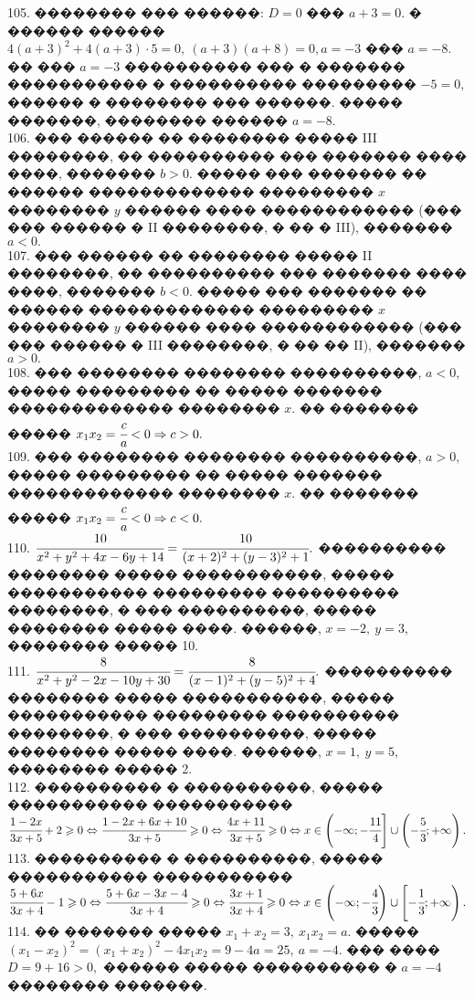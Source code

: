 \documentclass[12pt]{article}
\begin{document}
105. �������� ��� ������: $D=0$ ��� $a+3=0.$ � ������ ������ $4(a+3)^2+4(a+3)\cdot5=0,\ (a+3)(a+8)=0, a=-3$ ��� $a=-8.$ �� ��� $a=-3$ ���������� ��� � ������� ����������� � ���������� ��������� $-5=0,$ ������ � �������� ��� ������. ����� �������, �������� ������ $a=-8.$\\
106. ��� ������ �� �������� ����� III ��������, �� ���������� ��� ������� ���� ����, ������� $b>0.$ ����� ��� ������� �� ������ ������������� ��������� $x$ �������� $y$ ������ ���� ������������ (��� ��� ������ � II ��������, � �� � III), ������� $a<0.$\\
107. ��� ������ �� �������� ����� II ��������, �� ���������� ��� ������� ���� ����, ������� $b<0.$ ����� ��� ������� �� ������ ������������� ��������� $x$ �������� $y$ ������ ���� ������������ (��� ��� ������ � III ��������, � �� �� II), ������� $a>0.$\\
108. ��� �������� �������� ����������, $a<0,$ ����� ��������� �� ����� ������� ������������� �������� $x.$ �� ������� ����� $x_1x_2=\cfrac{c}{a}<0\Rightarrow c>0.$\\
109. ��� �������� �������� ����������, $a>0,$ ����� ��������� �� ����� ������� ������������� �������� $x.$ �� ������� ����� $x_1x_2=\cfrac{c}{a}<0\Rightarrow c<0.$\\
110. $\cfrac{10}{x^2+y^2+4x-6y+14}=\cfrac{10}{(x+2)^2+(y-3)^2+1}.$ ���������� �������� ����� �����������, ����� ����������� ��������� ���������� ��������, � ��� ����������, ����� �������� ����� ����. ������, $x=-2,\ y=3,$ �������� ����� 10.\\
111. $\cfrac{8}{x^2+y^2-2x-10y+30}=\cfrac{8}{(x-1)^2+(y-5)^2+4}.$ ���������� �������� ����� �����������, ����� ����������� ��������� ���������� ��������, � ��� ����������, ����� �������� ����� ����. ������, $x=1,\ y=5,$ �������� ����� 2.\\
112. ���������� � ����������, ����� ����������� ����������� $\cfrac{1-2x}{3x+5}+2\geqslant0\Leftrightarrow\cfrac{1-2x+6x+10}{3x+5}\geqslant0\Leftrightarrow
\cfrac{4x+11}{3x+5}\geqslant0\Leftrightarrow x\in\left(-\infty;-\cfrac{11}{4}\right]\cup\left(-\cfrac{5}{3};+\infty\right).$\\
113. ���������� � ����������, ����� ����������� ����������� $\cfrac{5+6x}{3x+4}-1\geqslant0\Leftrightarrow\cfrac{5+6x-3x-4}{3x+4}\geqslant0\Leftrightarrow
\cfrac{3x+1}{3x+4}\geqslant0\Leftrightarrow x\in\left(-\infty;-\cfrac{4}{3}\right)\cup\left[-\cfrac{1}{3};+\infty\right).$\\
114. �� ������� ����� $x_1+x_2=3,\ x_1x_2=a.$ ����� $(x_1-x_2)^2=(x_1+x_2)^2-4x_1x_2=9-4a=25,\ a=-4.$ ��� ���� $D=9+16>0,$ ������ ����� ���������� � $a=-4$ �������� �������.\\
\end{document}
